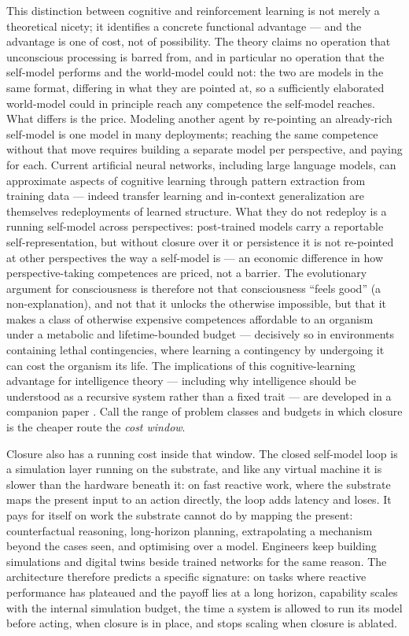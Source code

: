 \documentclass[12pt]{article}
\begin{document}
This distinction between cognitive and reinforcement learning is not merely a theoretical nicety; it identifies a concrete functional advantage --- and the advantage is one of cost, not of possibility. The theory claims no operation that unconscious processing is barred from, and in particular no operation that the self-model performs and the world-model could not: the two are models in the same format, differing in what they are pointed at, so a sufficiently elaborated world-model could in principle reach any competence the self-model reaches. What differs is the price. Modeling another agent by re-pointing an already-rich self-model is one model in many deployments; reaching the same competence without that move requires building a separate model per perspective, and paying for each. Current artificial neural networks, including large language models, can approximate aspects of cognitive learning through pattern extraction from training data --- indeed transfer learning and in-context generalization are themselves redeployments of learned structure. What they do not redeploy is a running self-model across perspectives: post-trained models carry a reportable self-representation, but without closure over it or persistence it is not re-pointed at other perspectives the way a self-model is --- an economic difference in how perspective-taking competences are priced, not a barrier. The evolutionary argument for consciousness is therefore not that consciousness ``feels good'' (a non-explanation), and not that it unlocks the otherwise impossible, but that it makes a class of otherwise expensive competences affordable to an organism under a metabolic and lifetime-bounded budget --- decisively so in environments containing lethal contingencies, where learning a contingency by undergoing it can cost the organism its life. The implications of this cognitive-learning advantage for intelligence theory --- including why intelligence should be understood as a recursive system rather than a fixed trait --- are developed in a companion paper \citep{Gruber2026a}. Call the range of problem classes and budgets in which closure is the cheaper route the \emph{cost window}.

Closure also has a running cost inside that window. The closed self-model loop is a simulation layer running on the substrate, and like any virtual machine it is slower than the hardware beneath it: on fast reactive work, where the substrate maps the present input to an action directly, the loop adds latency and loses. It pays for itself on work the substrate cannot do by mapping the present: counterfactual reasoning, long-horizon planning, extrapolating a mechanism beyond the cases seen, and optimising over a model. Engineers keep building simulations and digital twins beside trained networks for the same reason. The architecture therefore predicts a specific signature: on tasks where reactive performance has plateaued and the payoff lies at a long horizon, capability scales with the internal simulation budget, the time a system is allowed to run its model before acting, when closure is in place, and stops scaling when closure is ablated.
\end{document}
